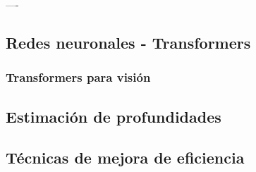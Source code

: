 
\clearpage










----

\subsection{Redes neuronales - Transformers}
\subsubsection{Transformers para visión}
\subsection{Estimación de profundidades}
\subsection{Técnicas de mejora de eficiencia} \label{eficiencia-general}
